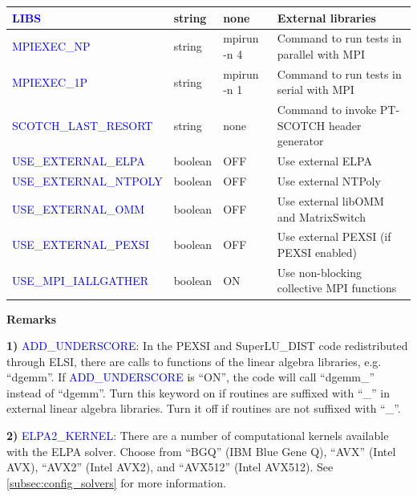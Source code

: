 \documentclass{report}
\begin{document}
\begin{tabular}[]{|p{50mm}|p{15mm}|p{20mm}|p{80mm}|}
\hline
\textcolor{blue}{LIBS}                     & string  & none        & External libraries\\
\hline
\textcolor{blue}{MPIEXEC\_NP}              & string  & mpirun -n 4 & Command to run tests in parallel with MPI\\
\hline
\textcolor{blue}{MPIEXEC\_1P}              & string  & mpirun -n 1 & Command to run tests in serial with MPI\\
\hline
\textcolor{blue}{SCOTCH\_LAST\_RESORT}     & string  & none        & Command to invoke PT-SCOTCH header generator\\
\hline
\textcolor{blue}{USE\_EXTERNAL\_ELPA}      & boolean & OFF         & Use external ELPA\\
\hline
\textcolor{blue}{USE\_EXTERNAL\_NTPOLY}    & boolean & OFF         & Use external NTPoly\\
\hline
\textcolor{blue}{USE\_EXTERNAL\_OMM}       & boolean & OFF         & Use external libOMM and MatrixSwitch\\
\hline
\textcolor{blue}{USE\_EXTERNAL\_PEXSI}     & boolean & OFF         & Use external PEXSI (if PEXSI enabled)\\
\hline
\textcolor{blue}{USE\_MPI\_IALLGATHER}     & boolean & ON          & Use non-blocking collective MPI functions\\
\hline
\end{tabular}

\textbf{Remarks}

\textbf{1)} \textcolor{blue}{ADD\_UNDERSCORE}: In the PEXSI and SuperLU\_DIST code redistributed through ELSI, there are calls to functions of the linear algebra libraries, e.g. ``dgemm''. If \textcolor{blue}{ADD\_UNDERSCORE} is ``ON'', the code will call ``dgemm\_'' instead of ``dgemm''. Turn this keyword on if routines are suffixed with ``\_'' in external linear algebra libraries. Turn it off if routines are not suffixed with ``\_''.

\textbf{2)} \textcolor{blue}{ELPA2\_KERNEL}: There are a number of computational kernels available with the ELPA solver. Choose from ``BGQ'' (IBM Blue Gene Q), ``AVX'' (Intel AVX), ``AVX2'' (Intel AVX2), and ``AVX512'' (Intel AVX512). See \ref{subsec:config_solvers} for more information.
\end{document}
